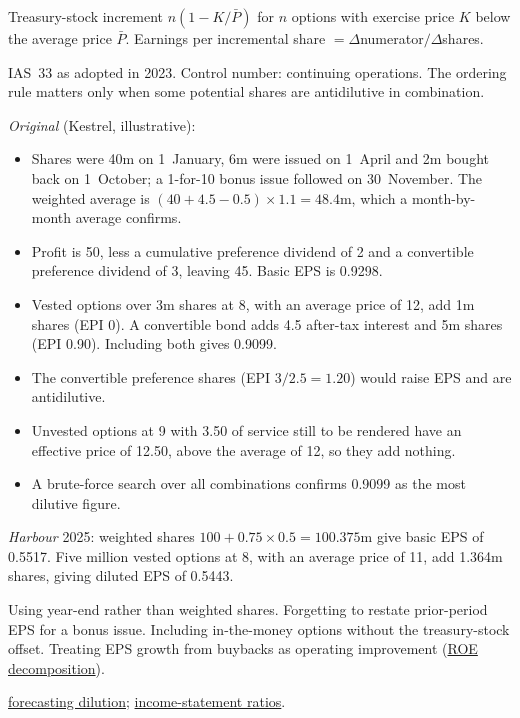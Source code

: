 \begin{qfmethod}
 Treasury-stock increment $n(1-K/\bar P)$ for $n$ options with exercise price $K$ below the average price $\bar P$. Earnings per incremental share $=\Delta$numerator$/\Delta$shares.

 IAS~33 as adopted in 2023. Control number: continuing operations. The ordering rule matters only when some potential shares are antidilutive in combination.

 \emph{Original} (Kestrel, illustrative):
\begin{itemize}
\item Shares were 40m on 1~January, 6m were issued on 1~April and 2m bought back on 1~October; a 1-for-10 bonus issue followed on 30~November. The weighted average is $(40+4.5-0.5)\times1.1=48.4$m, which a month-by-month average confirms.
\item Profit is 50, less a cumulative preference dividend of 2 and a convertible preference dividend of 3, leaving 45. Basic EPS is 0.9298.
\item Vested options over 3m shares at 8, with an average price of 12, add 1m shares (EPI 0). A convertible bond adds 4.5 after-tax interest and 5m shares (EPI 0.90). Including both gives 0.9099.
\item The convertible preference shares (EPI $3/2.5=1.20$) would raise EPS and are antidilutive.
\item Unvested options at 9 with 3.50 of service still to be rendered have an effective price of 12.50, above the average of 12, so they add nothing.
\item A brute-force search over all combinations confirms 0.9099 as the most dilutive figure.
\end{itemize}
\emph{Harbour} 2025: weighted shares $100+0.75\times0.5=100.375$m give basic EPS of 0.5517. Five million vested options at 8, with an average price of 11, add 1.364m shares, giving diluted EPS of 0.5443.

 Using year-end rather than weighted shares. Forgetting to restate prior-period EPS for a bonus issue. Including in-the-money options without the treasury-stock offset. Treating EPS growth from buybacks as operating improvement (\hyperref[meth:return-on-equity-decomposition]{ROE decomposition}).

 \hyperref[meth:share-based-compensation-modelling]{forecasting dilution}; \hyperref[meth:income-statement-ratios]{income-statement ratios}.

\end{qfmethod}

